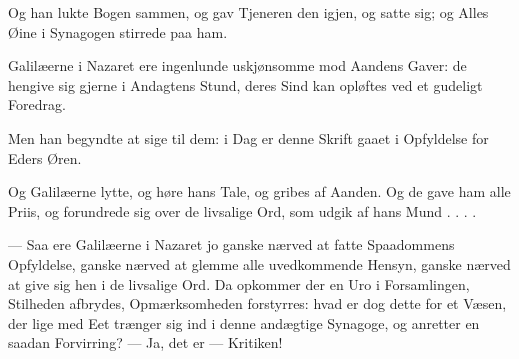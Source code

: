 \documentclass[12pt,a4paper]{book}
\begin{document}
\begingroup\large
Og han lukte Bogen sammen, og gav Tjeneren den
igjen, og satte sig; og Alles Øine i Synagogen stirrede paa ham.
\par\endgroup

Galilæerne i Nazaret ere ingenlunde uskjønsomme mod Aandens Gaver: de hengive sig gjerne
i Andagtens Stund, deres Sind kan opløftes ved et gudeligt Foredrag.

\begingroup\large
Men han begyndte at sige til dem: i Dag er denne Skrift gaaet i Opfyldelse for Eders Øren.
\par\endgroup

Og Galilæerne lytte, og høre hans Tale, og gribes af Aanden. {\large Og de gave ham alle
Priis, og forundrede sig over de livsalige Ord, som udgik af hans Mund . . . .}

--- Saa ere Galilæerne i Nazaret jo ganske nærved at fatte Spaadommens Opfyldelse, ganske
nærved at glemme alle uvedkommende Hensyn, ganske nærved at give sig hen i de livsalige
Ord. Da opkommer der en Uro i Forsamlingen, Stilheden afbrydes, Opmærksomheden
forstyrres: hvad er dog dette for et Væsen, der lige med Eet trænger sig ind i denne
andægtige Synagoge, og anretter en saadan Forvirring? --- Ja, det er --- Kritiken!
\end{document}
